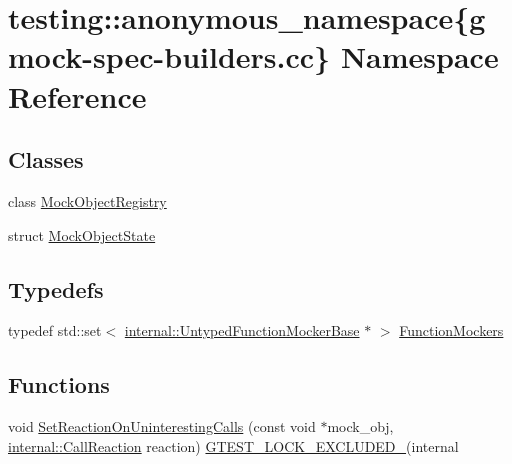 \hypertarget{namespacetesting_1_1anonymous__namespace_02gmock-spec-builders_8cc_03}{}\section{testing\+:\+:anonymous\+\_\+namespace\{gmock-\/spec-\/builders.cc\} Namespace Reference}
\label{namespacetesting_1_1anonymous__namespace_02gmock-spec-builders_8cc_03}
\subsection*{Classes}
\begin{DoxyCompactItemize}
\item 
class \hyperlink{classtesting_1_1anonymous__namespace_02gmock-spec-builders_8cc_03_1_1MockObjectRegistry}{Mock\+Object\+Registry}
\item 
struct \hyperlink{structtesting_1_1anonymous__namespace_02gmock-spec-builders_8cc_03_1_1MockObjectState}{Mock\+Object\+State}
\end{DoxyCompactItemize}
\subsection*{Typedefs}
\begin{DoxyCompactItemize}
\item 
typedef std\+::set$<$ \hyperlink{classtesting_1_1internal_1_1UntypedFunctionMockerBase}{internal\+::\+Untyped\+Function\+Mocker\+Base} $\ast$ $>$ \hyperlink{namespacetesting_1_1anonymous__namespace_02gmock-spec-builders_8cc_03_abf8c9e1e1f8466bdd16e9f399af53be3}{Function\+Mockers}
\end{DoxyCompactItemize}
\subsection*{Functions}
\begin{DoxyCompactItemize}
\item 
void \hyperlink{namespacetesting_1_1anonymous__namespace_02gmock-spec-builders_8cc_03_a4b6c5727bdd640c48b03da3a39b66f8e}{Set\+Reaction\+On\+Uninteresting\+Calls} (const void $\ast$mock\+\_\+obj, \hyperlink{namespacetesting_1_1internal_adfcd859062983a889f4bd18e6977357e}{internal\+::\+Call\+Reaction} reaction) \hyperlink{gtest-port_8h_a69abff5a4efdd07bd5faebe3dd318d06}{G\+T\+E\+S\+T\+\_\+\+L\+O\+C\+K\+\_\+\+E\+X\+C\+L\+U\+D\+E\+D\+\_\+}(internal
\end{DoxyCompactItemize}

